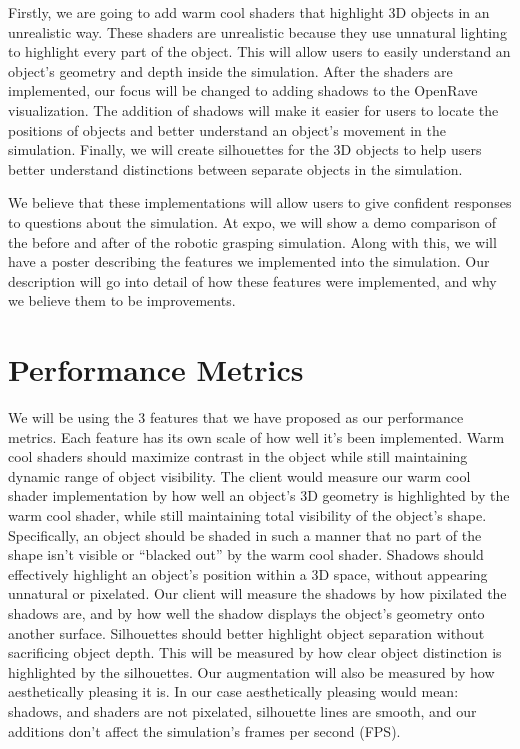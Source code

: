 \documentclass[10pt,journal,compsoc]{IEEEtran}
\begin{document}
Firstly, we are going to add warm cool shaders that highlight 3D objects in an unrealistic way. 
These shaders are unrealistic because they use unnatural lighting to highlight every part of the object. 
This will allow users to easily understand an object’s geometry and depth inside the simulation.
After the shaders are implemented, our focus will be changed to adding shadows to the OpenRave visualization. 
The addition of shadows will make it easier for users to locate the positions of objects and better understand an object’s movement in the simulation. 
Finally, we will create silhouettes for the 3D objects to help users better understand distinctions between separate objects in the simulation. \par

We believe that these implementations will allow users to give confident responses to questions about the simulation.
At expo, we will show a demo comparison of the before and after of the robotic grasping simulation. 
Along with this, we will have a poster describing the features we implemented into the simulation. 
Our description will go into detail of how these features were implemented, and why we believe them to be improvements.

\section{Performance Metrics}
We will be using the 3 features that we have proposed as our performance metrics.
Each feature has its own scale of how well it’s been implemented. 
Warm cool shaders should maximize contrast in the object while still maintaining dynamic range of object visibility. 
The client would measure our warm cool shader implementation by how well an object’s 3D geometry is highlighted by the warm cool shader, while still maintaining total visibility of the object’s shape. 
Specifically, an object should be shaded in such a manner that no part of the shape isn’t visible or “blacked out” by the warm cool shader.
Shadows should effectively highlight an object’s position within a 3D space, without appearing unnatural or pixelated. 
Our client will measure the shadows by how pixilated the shadows are, and by how well the shadow displays the object’s geometry onto another surface. 
Silhouettes should better highlight object separation without sacrificing object depth. 
This will be measured by how clear object distinction is highlighted by the silhouettes.
Our augmentation will also be measured by how aesthetically pleasing it is. 
In our case aesthetically pleasing would mean: shadows, and shaders are not pixelated, silhouette lines are smooth, and our additions don’t affect the simulation’s frames per second (FPS).  
\end{document}

